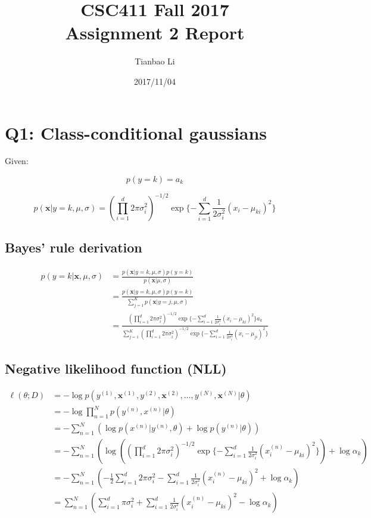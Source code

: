 \documentclass[a4paper]{article}
\title{CSC411 Fall 2017\\Assignment 2 Report}
\author{Tianbao Li}
\date{2017/11/04}
\begin{document}
\maketitle

\section{Q1: Class-conditional gaussians}

Given:

\begin{equation}
    p(y=k)=a_k
\end{equation}

\begin{equation}
    p(\mathbf{x}|y=k,\mu,\sigma)=(\prod^d_{i=1}2\pi\sigma^2_i)^{-1/2}\exp\{-\sum^d_{i=1}\frac{1}{2\sigma^2_i}(x_i-\mu_{ki})^2\}
\end{equation}

\subsection{Bayes' rule derivation}

\begin{align*}
    p(y=k|\mathbf{x},\mu,\sigma)&=\frac{p(\mathbf{x}|y=k,\mu,\sigma)p(y=k)}{p(\mathbf{x}|\mu,\sigma)}\\
    &=\frac{p(\mathbf{x}|y=k,\mu,\sigma)p(y=k)}{\sum^K_{j=1}p(\mathbf{x}|y=j,\mu,\sigma)}\\
    &=\frac{(\prod^d_{i=1}2\pi\sigma^2_i)^{-1/2}\exp\{-\sum^d_{i=1}\frac{1}{2\sigma^2_i}(x_i-\mu_{ki})^2\}a_k}{\sum^K_{j=1}(\prod^d_{i=1}2\pi\sigma^2_i)^{-1/2}\exp\{-\sum^d_{i=1}\frac{1}{2\sigma^2_i}(x_i-\mu_{ji})^2\}}
\end{align*}

\subsection{Negative likelihood function (NLL)}

\begin{align*}
    \ell(\theta;D)&=-\log p(y^{(1)},\mathbf{x}^{(1)},y^{(2)},\mathbf{x}^{(2)},\dots,y^{(N)},\mathbf{x}^{(N)}|\theta)\\
    &=-\log\prod^N_{n=1}p(y^{(n)},x^{(n)}|\theta)\\
    &=-\sum^N_{n=1}(\log p(x^{(n)}|y^{(n)},
    \theta)+\log p(y^{(n)}|\theta))\\
    &=-\sum^N_{n=1}(\log((\prod^d_{i=1}2\pi\sigma^2_i)^{-1/2}\exp\{-\sum^d_{i=1}\frac{1}{2\sigma^2_i}(x_i^{(n)}-\mu_{ki})^2\})+\log\alpha_k)\\
    &=-\sum^N_{n=1}(-\frac{1}{2}\sum^d_{i=1}2\pi\sigma^2_i-\sum^d_{i=1}\frac{1}{2\sigma^2_i}(x^{(n)}_i-\mu_{ki})^2+\log\alpha_k)\\
    &=\sum^N_{n=1}(\sum^d_{i=1}\pi\sigma^2_i+\sum^d_{i=1}\frac{1}{2\sigma^2_i}(x^{(n)}_i-\mu_{ki})^2-\log\alpha_k)
\end{align*}
\end{document}

